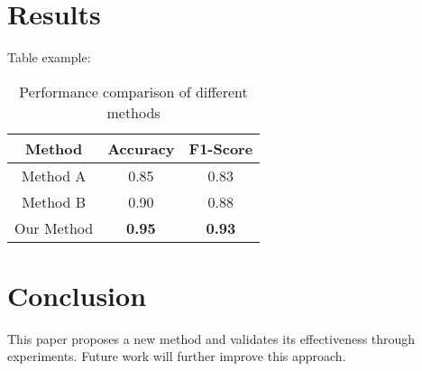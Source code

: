 \documentclass[12pt,a4paper]{article}
\begin{document}
\section{Results}

Table example:

\begin{table}[h]
\centering
\begin{tabular}{|c|c|c|}
\hline
Method & Accuracy & F1-Score \\
\hline
Method A & 0.85 & 0.83 \\
Method B & 0.90 & 0.88 \\
Our Method & \textbf{0.95} & \textbf{0.93} \\
\hline
\end{tabular}
\caption{Performance comparison of different methods}
\label{tab:results}
\end{table}

\section{Conclusion}

This paper proposes a new method and validates its effectiveness through experiments. Future work will further improve this approach\cite{future2024}.



\end{document}
